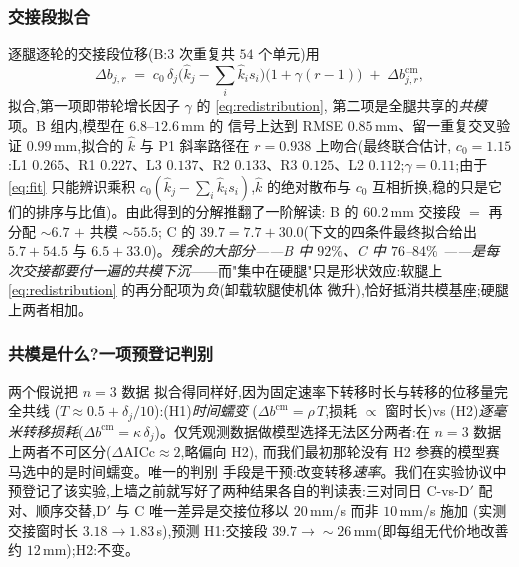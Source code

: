 \documentclass[journal]{IEEEtran}
\begin{document}
\subsubsection{交接段拟合}
逐腿逐轮的交接段位移(B:$3$ 次重复共 $54$ 个单元)用
\begin{equation}
\Delta b_{j,r} \;=\;
c_0\,\delta_j\bigl(\hat{k}_j - \textstyle\sum_i \hat{k}_i s_i\bigr)
\bigl(1+\gamma(r{-}1)\bigr) \;+\; \Delta b^{\mathrm{cm}}_{j,r},
\label{eq:fit}
\end{equation}
拟合,第一项即带轮增长因子 $\gamma$ 的 \eqref{eq:redistribution},
第二项是全腿共享的\emph{共模}项。B 组内,模型在 $6.8$--$12.6$\,mm 的
信号上达到 RMSE $0.85$\,mm、留一重复交叉验证 $0.99$\,mm,拟合的
$\hat{k}$ 与 P1 斜率路径在 $r=0.938$ 上吻合(最终联合估计,
$c_0=1.15$:L1 $0.265$、R1 $0.227$、L3 $0.137$、R2 $0.133$、R3
$0.125$、L2 $0.112$;$\gamma=0.11$;由于 \eqref{eq:fit} 只能辨识乘积
$c_0(\hat{k}_j - \sum_i \hat{k}_i s_i)$,$\hat{k}$ 的绝对散布与 $c_0$
互相折换,稳的只是它们的排序与比值)。由此得到的分解推翻了一阶解读:
B 的 $60.2$\,mm 交接段 $=$ 再分配 ${\sim}6.7$ $+$ 共模 ${\sim}55.5$;
C 的 $39.7 = 7.7 + 30.0$(下文的四条件最终拟合给出 $5.7+54.5$ 与
$6.5+33.0$)。\emph{残余的大部分——B 中 $92\%$、C 中 $76$--$84\%$
——是每次交接都要付一遍的共模下沉}——而"集中在硬腿"只是形状效应:软腿上
\eqref{eq:redistribution} 的再分配项为\emph{负}(卸载软腿使机体
微升),恰好抵消共模基座;硬腿上两者相加。

\subsubsection{共模是什么?一项预登记判别}两个假说把 $n{=}3$ 数据
拟合得同样好,因为固定速率下转移时长与转移的位移量完全共线
($T \approx 0.5 + \delta_j/10$):(H1)\emph{时间蠕变}
($\Delta b^{\mathrm{cm}} = \rho\,T$,损耗 $\propto$ 窗时长)vs
(H2)\emph{逐毫米转移损耗}($\Delta b^{\mathrm{cm}} =
\kappa\,\delta_j$)。仅凭观测数据做模型选择无法区分两者:在
$n{=}3$ 数据上两者不可区分($\Delta$AICc${\approx}2$,略偏向 H2),
而我们最初那轮没有 H2 参赛的模型赛马选中的是时间蠕变。唯一的判别
手段是干预:改变转移\emph{速率}。我们在实验协议中
预登记了该实验,上墙之前就写好了两种结果各自的判读表:三对同日
C-vs-D$'$ 配对、顺序交替,D$'$ 与 C 唯一差异是交接位移以 $20$\,mm/s 而非 $10$\,mm/s 施加
(实测交接窗时长 $3.18\to1.83$\,s),预测 H1:交接段
$39.7\to{\sim}26$\,mm(即每组无代价地改善约 $12$\,mm);H2:不变。
\end{document}

